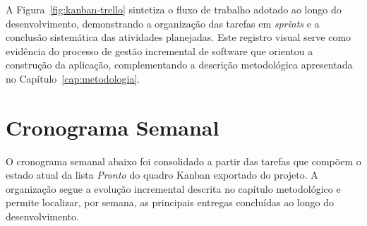 \begin{apendicesenv}
A Figura~\ref{fig:kanban-trello} sintetiza o fluxo de trabalho adotado ao longo do desenvolvimento, 
demonstrando a organização das tarefas em \textit{sprints} e a conclusão sistemática das atividades planejadas. 
Este registro visual serve como evidência do processo de gestão incremental de software que orientou a construção da aplicação,
complementando a descrição metodológica apresentada no Capítulo~\ref{cap:metodologia}.

\section{Cronograma Semanal}
\label{ap:impl-cronograma}

O cronograma semanal abaixo foi consolidado a partir das tarefas que compõem o estado atual da
lista \textit{Pronto} do quadro Kanban exportado do projeto. A organização segue a evolução
incremental descrita no capítulo metodológico e permite localizar, por semana, as principais
entregas concluídas ao longo do desenvolvimento.


\end{apendicesenv}
